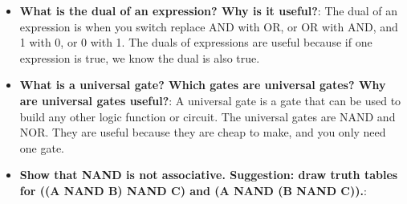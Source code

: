 \documentclass{report}
\begin{document}
\begin{itemize}
        \item \textbf{What is the dual of an expression? Why is it useful?}:
            The dual of an expression is when you switch replace AND with OR, or OR with AND, and 1 with 0, or 0 with 1. The duals of expressions are useful because if one expression is true, we know the dual is also true.
        \item \textbf{What is a universal gate? Which gates are universal gates? Why are universal gates useful?}: A universal gate is a gate that can be used to build any other logic function or circuit. The universal gates are NAND and NOR.
            \bigbreak \noindent 
            They are useful because they are cheap to make, and you only need one gate.
        \item \textbf{Show that NAND is not associative. Suggestion: draw truth tables for ((A NAND B) NAND C) and (A NAND (B NAND C)).}:
    \end{itemize}
\end{document}
